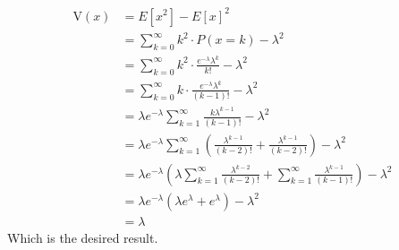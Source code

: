 \documentclass[letterpaper,12pt]{article}
\theoremstyle{definition}
\begin{document}
\begin{align*}
    \text{V}(x) &= E[x^2] - E[x]^2 \\
    &= \sum_{k=0}^{\infty} k^2 \cdot P(x=k) - \lambda^2 \\
    &= \sum_{k=0}^{\infty} k^2 \cdot \frac{e^{-\lambda} \lambda^k}{k!} - \lambda^2 \\
    &= \sum_{k=0}^{\infty} k \cdot \frac{e^{-\lambda} \lambda^k}{(k-1)!} - \lambda^2 \\
    &= \lambda e^{-\lambda} \sum_{k=1}^{\infty} \frac{k \lambda^{k-1}}{(k-1)!} - \lambda^2 \\
    &= \lambda e^{-\lambda} \sum_{k=1}^{\infty} \left( \frac{\lambda^{k-1}}{(k-2)!} + \frac{\lambda^{k-1}}{(k-2)!} \right) - \lambda^2 \\
    &= \lambda e^{-\lambda} \left( \lambda \sum_{k=1}^{\infty} \frac{\lambda^{k-2}}{(k-2)!} + \sum_{k=1}^{\infty} \frac{\lambda^{k-1}}{(k-1)!} \right) - \lambda^2 \\
    &= \lambda e^{-\lambda} \left( \lambda e^{\lambda} + e^{\lambda} \right) - \lambda^2 \\
    &= \lambda
\end{align*}
Which is the desired result.
\end{document}
